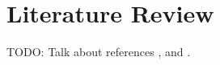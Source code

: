\section{Literature Review}

TODO: Talk about references \cite{tdp}, \cite{STP} and \cite{zickler}.
